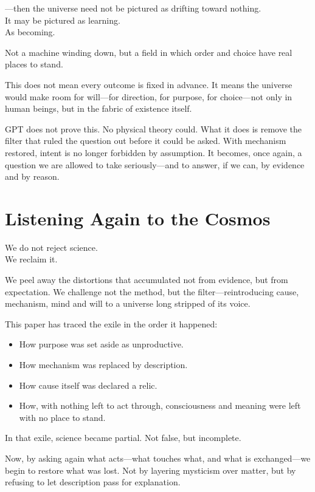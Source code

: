 \documentclass[11pt,a4paper]{article}
\begin{document}
---then the universe need not be pictured as drifting toward nothing.\\
It may be pictured as learning.\\
As becoming.

Not a machine winding down, but a field in which order and choice have real places to stand.

This does not mean every outcome is fixed in advance. It means the universe would make room for will---for direction, for purpose, for choice---not only in human beings, but in the fabric of existence itself.

GPT does not prove this. No physical theory could. What it does is remove the filter that ruled the question out before it could be asked. With mechanism restored, intent is no longer forbidden by assumption. It becomes, once again, a question we are allowed to take seriously---and to answer, if we can, by evidence and by reason.

\section{Listening Again to the Cosmos}

We do not reject science.\\
We reclaim it.

We peel away the distortions that accumulated not from evidence, but from expectation. We challenge not the method, but the filter---reintroducing cause, mechanism, mind and will to a universe long stripped of its voice.

This paper has traced the exile in the order it happened:

\begin{itemize}
  \item How purpose was set aside as unproductive.
  \item How mechanism was replaced by description.
  \item How cause itself was declared a relic.
  \item How, with nothing left to act through, consciousness and meaning were left with no place to stand.
\end{itemize}

In that exile, science became partial. Not false, but incomplete.

Now, by asking again what acts---what touches what, and what is exchanged---we begin to restore what was lost. Not by layering mysticism over matter, but by refusing to let description pass for explanation.
\end{document}
